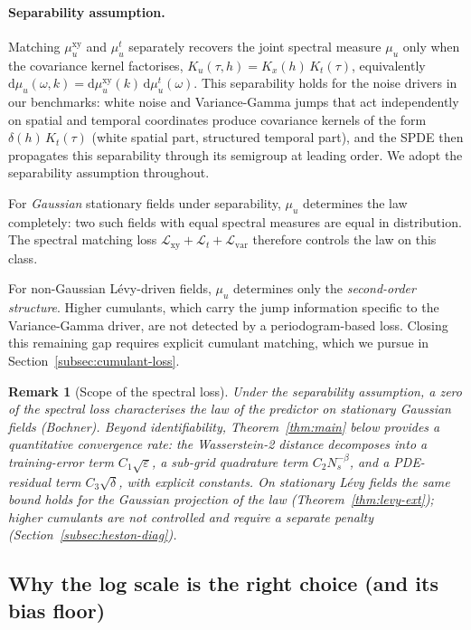 \documentclass[review,12pt]{elsarticle}
\newtheorem{remark}{Remark}
\begin{document}
\paragraph{Separability assumption.}
Matching \(\mu^{\mathrm{xy}}_u\) and \(\mu^t_u\) separately
recovers the joint spectral measure \(\mu_u\) only when the
covariance kernel factorises, \(K_u(\tau, h) = K_x(h)\, K_t(\tau)\),
equivalently \(\mathrm d\mu_u(\omega, k) = \mathrm d\mu^{\mathrm{xy}}_u(k)\,
\mathrm d\mu^t_u(\omega)\). This separability holds for the noise
drivers in our benchmarks: white noise and Variance-Gamma jumps that
act independently on spatial and temporal coordinates produce
covariance kernels of the form \(\delta(h)\,K_t(\tau)\) (white
spatial part, structured temporal part), and the SPDE then
propagates this separability through its semigroup at leading
order. We adopt the separability assumption throughout.

For \emph{Gaussian} stationary fields under separability,
\(\mu_u\) determines the law completely: two such fields with
equal spectral measures are equal in distribution. The spectral
matching loss
\(\mathcal L_{\mathrm{xy}} + \mathcal L_t + \mathcal L_{\mathrm{var}}\)
therefore controls the law on this class.

For non-Gaussian L\'evy-driven fields, \(\mu_u\) determines only
the \emph{second-order structure}. Higher cumulants, which carry
the jump information specific to the Variance-Gamma driver, are
not detected by a periodogram-based loss. Closing this remaining
gap requires explicit cumulant matching, which we pursue in
Section~\ref{subsec:cumulant-loss}.

\begin{remark}[Scope of the spectral loss]
\label{rem:scope}
Under the separability assumption, a zero of the spectral loss
characterises the law of the predictor on stationary Gaussian fields
(Bochner). Beyond identifiability, Theorem~\ref{thm:main} below
provides a quantitative convergence rate: the Wasserstein-2 distance
decomposes into a training-error term \(C_1\sqrt{\varepsilon}\), a
sub-grid quadrature term \(C_2 N_s^{-\beta}\), and a PDE-residual
term \(C_3\sqrt{\delta}\), with explicit constants. On stationary
L\'evy fields the same bound holds for the Gaussian projection of the
law (Theorem~\ref{thm:levy-ext}); higher cumulants are not controlled
and require a separate penalty (Section~\ref{subsec:heston-diag}).
\end{remark}

\subsection{Why the log scale is the right choice (and its bias floor)}
\end{document}
